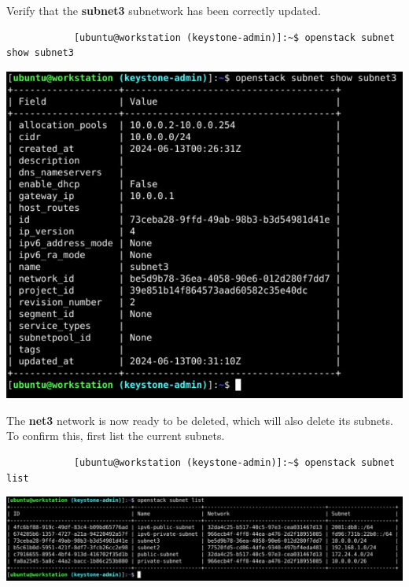 \documentclass[letterpaper, 12pt]{article}
\begin{document}
\begin{enumerate}
    \begin{labstep}
        Verify that the \textbf{subnet3} subnetwork has been correctly updated.
        \begin{lstlisting}
            [ubuntu@workstation (keystone-admin)]:~$ openstack subnet show subnet3
        \end{lstlisting}

        \begin{center}
            \includegraphics[width=\linewidth]{images/part3/step22.png}
        \end{center}
    \end{labstep}

    \begin{labstep}
        The \textbf{net3} network is now ready to be deleted, which will also delete its subnets.
        To confirm this, first list the current subnets.
        \begin{lstlisting}
            [ubuntu@workstation (keystone-admin)]:~$ openstack subnet list
        \end{lstlisting}

        \begin{center}
            \includegraphics[width=\linewidth]{images/part3/step23.png}
        \end{center}
    \end{labstep}


\end{enumerate}
\end{document}
